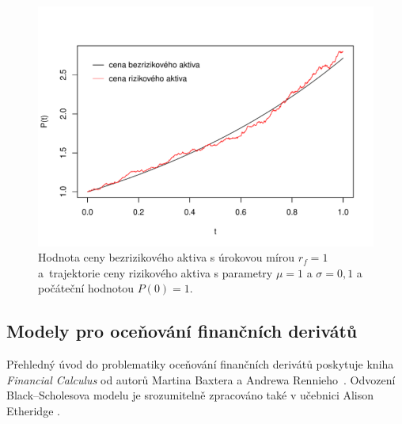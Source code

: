 \documentclass[a4paper,12pt]{report}
\theoremstyle{definition} \newtheorem{definice}[veta]{Definice}
\theoremstyle{remark}
\begin{document}
\begin{figure}[!htbp]
  \centering 
	\includegraphics[width=13.5cm, clip, trim= 0 15 25 50]{IMG/GWP_RFA_v5.pdf}
  \caption{Hodnota ceny bezrizikového aktiva s úrokovou mírou $r_f=1$ a~trajektorie ceny rizikového aktiva s parametry $\mu=1$ a  $\sigma=0,1$ a počáteční hodnotou $P(0)=1$.}  \label{asset_model_graf}
\end{figure}

\subsection{Modely pro oceňování finančních derivátů}\label{derivaty_kap}
Přehledný úvod do problematiky oceňování finančních derivátů poskytuje kniha \textit{Financial Calculus} od autorů Martina Baxtera a Andrewa Rennieho~\cite{baxter1996financial}.
Odvození Black–Scholesova modelu je srozumitelně zpracováno také v učebnici Alison Etheridge \cite{etheridge2002course}.
\end{document}
